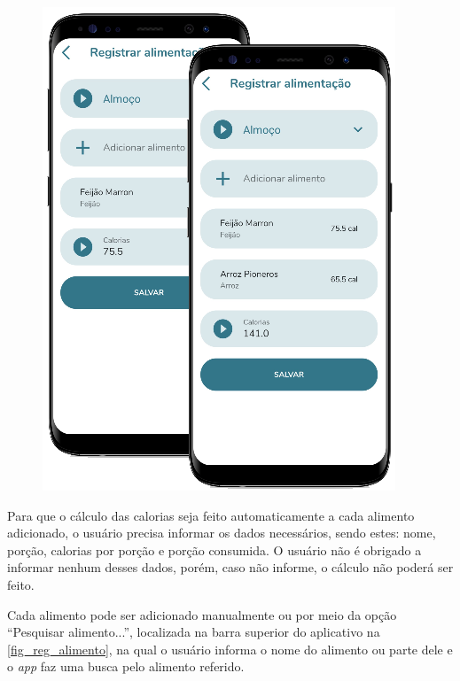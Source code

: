 \begin{figure}[htb]
\begin{minipage}{0.58\textwidth}
        \includegraphics[scale=0.66]{Imagens/desenvolvimento/app/reg_alimentacao_2.png}
    \end{minipage}
\end{figure}

Para que o cálculo das calorias seja feito automaticamente a cada alimento adicionado, o usuário precisa
informar os dados necessários, sendo estes: nome, porção, calorias por porção e porção consumida. O usuário
não é obrigado a informar nenhum desses dados, porém, caso não informe, o cálculo não poderá ser feito.

\newpage

Cada alimento pode ser adicionado manualmente ou por meio da opção ``Pesquisar alimento...'', localizada
na barra superior do aplicativo na \autoref{fig_reg_alimento}, na qual o usuário
informa o nome do alimento ou parte dele e o \emph{app} faz uma busca pelo alimento referido.

